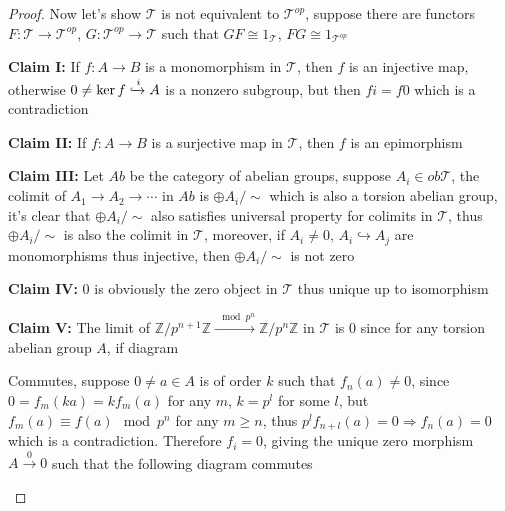 \documentclass{article}
\theoremstyle{definition}
\theoremstyle{remark}
\theoremstyle{definition}
\begin{document}
\begin{proof}
Now let's show $\mathcal T$ is not equivalent to $\mathcal T^{op}$, suppose there are functors $F:\mathcal T\to\mathcal T^{op}$, $G:\mathcal T^{op}\to\mathcal T$ such that $GF\cong1_{\mathcal T}$, $FG\cong1_{\mathcal T^{op}}$ \par
\textbf{Claim I: }If $f:A\to B$ is a monomorphism in $\mathcal T$, then $f$ is an injective map, otherwise $0\neq\ker f\xhookrightarrow{i} A$ is a nonzero subgroup, but then $fi=f0$ which is a contradiction \par
\textbf{Claim II: }If $f:A\to B$ is a surjective map in $\mathcal T$, then $f$ is an epimorphism \par
\textbf{Claim III: }Let $Ab$ be the category of abelian groups, suppose $A_i\in ob\mathcal T$, the colimit of $A_1\to A_2\to\cdots$ in $Ab$ is $\oplus A_i/\sim$ which is also a torsion abelian group, it's clear that $\oplus A_i/\sim$ also satisfies universal property for colimits in $\mathcal T$, thus $\oplus A_i/\sim$ is also the colimit in $\mathcal T$, moreover, if $A_i\neq0$, $A_i\hookrightarrow A_j$ are monomorphisms thus injective, then $\oplus A_i/\sim$ is not zero \par
\textbf{Claim IV: }$0$ is obviously the zero object in $\mathcal T$ thus unique up to isomorphism \par
\textbf{Claim V: }The limit of $\mathbb Z/p^{n+1}\mathbb Z\xrightarrow{\mod p^n}\mathbb Z/p^n\mathbb Z$ in $\mathcal T$ is $0$ since for any torsion abelian group $A$, if diagram
\begin{center}
\end{center}
Commutes, suppose $0\neq a\in A$ is of order $k$ such that $f_n(a)\neq0$, since $0=f_m(ka)=kf_m(a)$ for any $m$, $k=p^l$ for some $l$, but $f_m(a)\equiv f(a)\mod p^n$ for any $m\geq n$, thus $p^lf_{n+l}(a)=0\Rightarrow f_n(a)=0$ which is a contradiction. Therefore $f_i=0$, giving the unique zero morphism $A\xrightarrow{0}0$ such that the following diagram commutes \par
\begin{center}
\end{center}
\end{proof}
\end{document}
